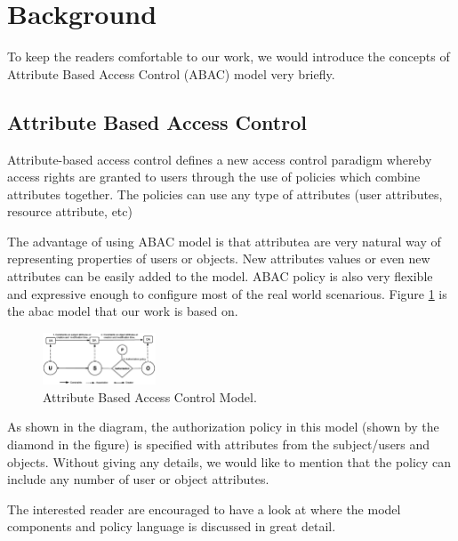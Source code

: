\section{Background}

To keep the readers comfortable to our work, we would introduce  the concepts of Attribute Based Access Control (ABAC) model very briefly.

\subsection{Attribute Based Access Control}

Attribute-based access control defines a new access control paradigm whereby access rights are granted to users through the use of policies which combine attributes together. The policies can use any type of attributes (user attributes, resource attribute, etc) \cite{abacwiki}

The advantage of using ABAC model is that attributea are  very natural way of representing properties of users or objects. New attributes values or even new attributes can be easily added to the model.  ABAC policy is also very flexible and expressive enough to configure most of the real world scenarious. Figure \ref{fig:abac} is the abac model  that our work is based on. 

\begin{figure}[h!] 
  \centering
    \includegraphics[width=0.3\textwidth]{eps/abac_model}
 \caption{Attribute Based Access Control Model.}
 \label{fig:abac}
\end{figure}

As shown in the diagram,   the authorization policy in this model (shown by the diamond in the figure) is specified with attributes from the subject/users and objects. Without giving any details, we would like to mention that the policy can include any number of user or object attributes.

The interested reader are encouraged to have a look at \cite{abac} where the model components and policy language is discussed in great detail. 

